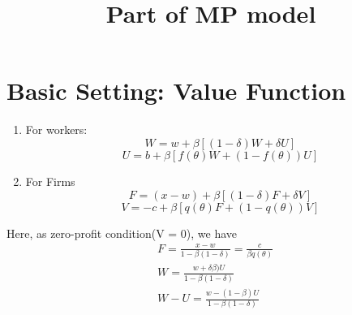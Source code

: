 \documentclass[12pt,a4paper]{article}
\title{Part of MP model}
\begin{document}
\maketitle
\section{Basic Setting: Value Function}
	\begin{enumerate}
		\item For workers:
		\[
		W = w + \beta [(1-\delta)W + \delta U]
		\]
		\[
		U = b + \beta [f(\theta)W + (1 - f(\theta))U]
		\]
		\item For Firms
		\[
		F = (x - w) + \beta [(1 - \delta)F + \delta V]
		\]
		\[
		V = -c + \beta [q(\theta)F + (1 - q(\theta))V]
		\]
	\end{enumerate}

	Here, as zero-profit condition(V = 0), we have 
	\begin{align}
	&F = \frac{x - w}{1 - \beta(1 - \delta)}  = \frac{c}{\beta q(\theta)} \\
	&W = \frac{w + \delta\beta)U}{1 - \beta(1-\delta)} \nonumber \\
	&W - U = \frac{w - (1-\beta)U}{1 - \beta(1-\delta)} 
	\end{align}

	
\end{document}
